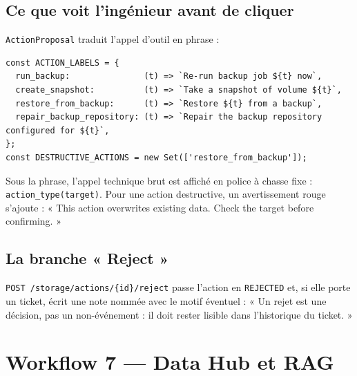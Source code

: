 \documentclass[11pt,a4paper]{report}
\newcommand{\cls}[1]{\texttt{\small\textcolor{oasisblue}{#1}}}
\newcommand{\route}[1]{\texttt{\small\textcolor{oasisgreen}{#1}}}
\begin{document}
\clearpage

\subsection*{Ce que voit l'ingénieur avant de cliquer}
\cls{ActionProposal} traduit l'appel d'outil en phrase :

\begin{lstlisting}[caption={frontend/src/components/ActionProposal.tsx}]
const ACTION_LABELS = {
  run_backup:               (t) => `Re-run backup job ${t} now`,
  create_snapshot:          (t) => `Take a snapshot of volume ${t}`,
  restore_from_backup:      (t) => `Restore ${t} from a backup`,
  repair_backup_repository: (t) => `Repair the backup repository configured for ${t}`,
};
const DESTRUCTIVE_ACTIONS = new Set(['restore_from_backup']);
\end{lstlisting}

\noindent
Sous la phrase, l'appel technique brut est affiché en police à chasse fixe :
\texttt{action\_type(target)}. Pour une action destructive, un avertissement
rouge s'ajoute : « This action overwrites existing data. Check the target before
confirming. »

\subsection*{La branche « Reject »}
\route{POST /storage/actions/\{id\}/reject} passe l'action en \texttt{REJECTED}
et, si elle porte un ticket, écrit une note nommée avec le motif éventuel :
« Un rejet est une décision, pas un non-événement : il doit rester lisible dans
l'historique du ticket. »

\section{Workflow 7 --- Data Hub et RAG}
\end{document}
